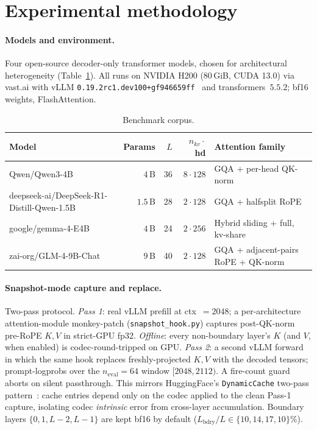 \documentclass[10pt,a4paper]{article}
\theoremstyle{definition}
\theoremstyle{plain}
\begin{document}
\section{Experimental methodology}
\label{sec:methodology}

\paragraph{Models and environment.}
Four open-source decoder-only transformer models, chosen for
architectural heterogeneity (Table~\ref{tab:models}). All runs on
NVIDIA H200 (80\,GiB, CUDA 13.0) via vast.ai with vLLM
\texttt{0.19.2rc1.dev100+gf946659ff}~\cite{vllm} and
transformers~$5.5.2$; bf16 weights, FlashAttention.

\begin{table}[H]
\centering
\small
\caption{Benchmark corpus.}
\label{tab:models}
\begin{tabular}{lrrrl}
  \toprule
  Model & Params & $L$ & $n_{kv}\cdot$hd & Attention family \\
  \midrule
  Qwen/Qwen3-4B                             & $4\,$B   & 36 & $8\cdot128$ & GQA + per-head QK-norm \\
  deepseek-ai/DeepSeek-R1-Distill-Qwen-1.5B & $1.5\,$B & 28 & $2\cdot128$ & GQA + halfsplit RoPE \\
  google/gemma-4-E4B                        & $4\,$B   & 24 & $2\cdot 256$ & Hybrid sliding + full, kv-share \\
  zai-org/GLM-4-9B-Chat                     & $9\,$B   & 40 & $2\cdot128$ & GQA + adjacent-pairs RoPE + QK-norm \\
  \bottomrule
\end{tabular}
\end{table}

\paragraph{Snapshot-mode capture and replace.}
\label{sec:methodology-snapshot}
Two-pass protocol. \emph{Pass 1}: real vLLM prefill at
ctx~$=\!2048$; a per-architecture attention-module monkey-patch
(\texttt{snapshot\_hook.py}) captures post-QK-norm pre-RoPE $K, V$
in strict-GPU fp32. \emph{Offline}: every non-boundary layer's
$K$ (and $V$, when enabled) is codec-round-tripped on GPU.
\emph{Pass 2}: a second vLLM forward in which the same hook
replaces freshly-projected $K, V$ with the decoded tensors;
prompt-logprobs over the $n_\mathrm{eval}=64$ window $[2048,2112)$.
A fire-count guard aborts on silent passthrough. This mirrors
HuggingFace's \texttt{DynamicCache} two-pass
pattern~\cite{huggingface-transformers}: cache entries depend only
on the codec applied to the clean Pass-1 capture, isolating codec
\emph{intrinsic} error from cross-layer accumulation. Boundary
layers $\{0,1,L{-}2,L{-}1\}$ are kept bf16 by default
($L_\mathrm{bdry}/L \in \{10, 14, 17, 10\}\%$).
\end{document}
